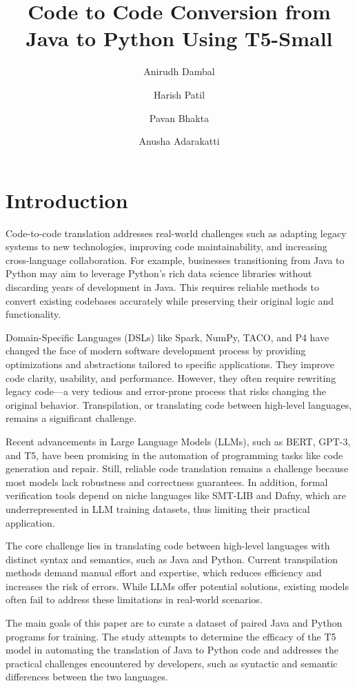 \documentclass{dhbenelux}
\author[1]{Anirudh Dambal}
\author[1]{Harish Patil}
\author[1]{Pavan Bhakta}
\author[1]{Anusha Adarakatti}
\affil{School of Computer Science and Engineering,
KLE Technological University, Hubballi, Karnataka, India, 580031}
\title{Code to Code Conversion from Java to Python
Using T5-Small}
\begin{document}
\maketitle

\section{Introduction}

Code-to-code translation addresses real-world challenges such as adapting legacy systems to new technologies, improving code maintainability, and increasing cross-language collaboration. For example, businesses transitioning from Java to Python may aim to leverage Python’s rich data science libraries without discarding years of development in Java. This requires reliable methods to convert existing codebases accurately while preserving their original logic and functionality.

Domain-Specific Languages (DSLs) like Spark, NumPy, TACO, and P4 have changed the face of modern software development process by providing optimizations and abstractions tailored to specific applications. They improve code clarity, usability, and performance. However, they often require rewriting legacy code—a very tedious and error-prone process that risks changing the original behavior. Transpilation, or translating code between high-level languages, remains a significant challenge.

Recent advancements in Large Language Models (LLMs), such as BERT, GPT-3, and T5, have been promising in the automation of programming tasks like code generation and repair. Still, reliable code translation remains a challenge because most models lack robustness and correctness guarantees. In addition, formal verification tools depend on niche languages like SMT-LIB and Dafny, which are underrepresented in LLM training datasets, thus limiting their practical application.

The core challenge lies in translating code between high-level languages with distinct syntax and semantics, such as Java and Python. Current transpilation methods demand manual effort and expertise, which reduces efficiency and increases the risk of errors. While LLMs offer potential solutions, existing models often fail to address these limitations in real-world scenarios.

The main goals of this paper are to curate a dataset of paired Java and Python programs for training. The study attempts to determine the efficacy of the T5 model in automating the translation of Java to Python code and addresses the practical challenges encountered by developers, such as syntactic and semantic differences between the two languages.
\end{document}

